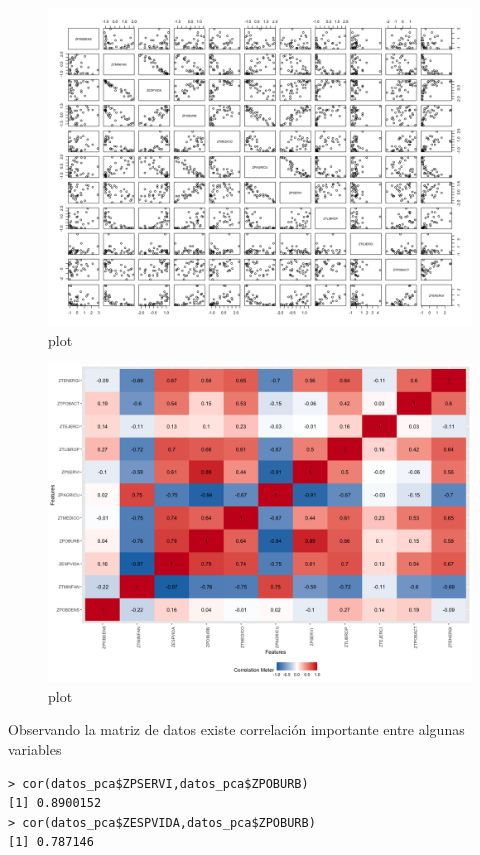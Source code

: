\documentclass[12pt,twoside]{report}
\begin{document}
\begin{figure}[H]
\includegraphics[width=\textwidth]{../code/figures/plot.png}
\caption{plot}
\label{fig:plot}
\end{figure} 

\begin{figure}[H]
\includegraphics[width=\textwidth]{../code/figures/plot_corr.png}
\caption{plot}
\label{fig:corr_matrix}
\end{figure} 

Observando la matriz de datos existe correlación importante entre algunas variables
 \begin{lstlisting}
> cor(datos_pca$ZPSERVI,datos_pca$ZPOBURB)
[1] 0.8900152
> cor(datos_pca$ZESPVIDA,datos_pca$ZPOBURB)
[1] 0.787146
\end{lstlisting}
\end{document}
